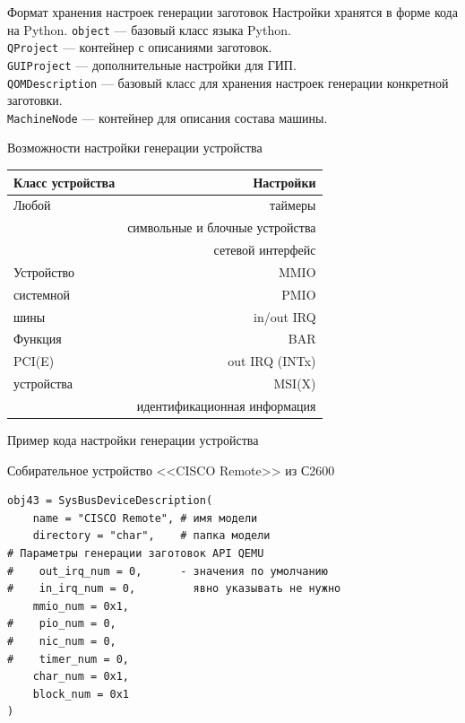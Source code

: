 \documentclass[unicode,hyperref={unicode=true}]{beamer}
\theoremstyle{definition}
\theoremstyle{plain}
\begin{document}
\begin{frame}{Формат хранения настроек генерации заготовок}
Настройки хранятся в форме кода на Python.
\vfill
{}
\vfill
\texttt{object} --- базовый класс языка Python.\\
\texttt{QProject} --- контейнер с описаниями заготовок.\\
\texttt{GUIProject} --- дополнительные настройки для ГИП.\\
\texttt{QOMDescription} --- базовый класс для хранения настроек генерации
конкретной заготовки.\\
\texttt{MachineNode} --- контейнер для описания состава машины.
\end{frame}




\begin{frame}{Возможности настройки генерации устройства}
\begin{center}
\begin{tabular}{l|r}
Класс устройства & Настройки \\
\hline
Любой            & таймеры \\
                 & символьные и блочные устройства \\
                 & сетевой интерфейс \\
\hline
Устройство       & MMIO \\
системной        & PMIO \\
шины             & in/out IRQ \\
\hline
Функция          & BAR \\
PCI(E)           & out IRQ (INTx) \\
устройства       & MSI(X) \\
                 & идентификационная информация
\end{tabular}
\end{center}
\end{frame}



\begin{frame}[fragile]{Пример кода настройки генерации устройства}
\begin{center}
Собирательное устройство <<CISCO Remote>> из С2600
\end{center}
\lstset{language=Python}
\begin{lstlisting}
obj43 = SysBusDeviceDescription(
    name = "CISCO Remote", # имя модели
    directory = "char",    # папка модели
# Параметры генерации заготовок API QEMU
#    out_irq_num = 0,      - значения по умолчанию
#    in_irq_num = 0,         явно указывать не нужно
    mmio_num = 0x1,
#    pio_num = 0,
#    nic_num = 0,
#    timer_num = 0,
    char_num = 0x1,
    block_num = 0x1
)
\end{lstlisting}
\end{frame}
\end{document}
